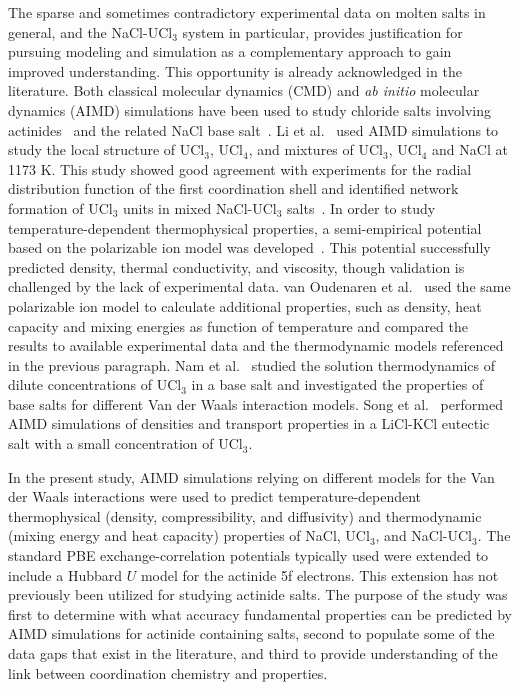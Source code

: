 \documentclass[preprint,3p,10pt,onecolumn,number,sort&compress]{elsarticle}
\begin{document}
The sparse and sometimes contradictory experimental data on molten salts in general, and the NaCl-UCl$_3$ system in particular, provides justification for pursuing modeling and simulation as a complementary approach to gain improved understanding. This opportunity is already acknowledged in the literature. Both classical molecular dynamics (CMD) and \textit{ab initio} molecular dynamics (AIMD) simulations have been used to study chloride salts involving actinides~\cite{Li,Li2020,Nam2015,SONG,VANOUDENAREN2021117470} and the related NaCl base salt~\cite{NGUYEN2021115262,LI2021100359,Tovey}. Li et al.~\cite{Li} used AIMD simulations to study the local structure of UCl$_3$, UCl$_4$, and mixtures of UCl$_3$, UCl$_4$ and NaCl at 1173 K. This study showed good agreement with experiments for the radial distribution function of the first coordination shell and identified network formation of UCl$_3$ units in mixed NaCl-UCl$_3$ salts~\cite{Li}. %
In order to study temperature-dependent thermophysical properties, a semi-empirical potential based on the polarizable ion model was developed~\cite{Li2020}. This potential successfully predicted density, thermal conductivity, and viscosity, though validation is challenged by the lack of experimental data. van Oudenaren et al.~\cite{VANOUDENAREN2021117470} used the same polarizable ion model to calculate additional properties, such as density, heat capacity and mixing energies as function of temperature and compared the results to available experimental data and the thermodynamic models referenced in the previous paragraph. 
Nam et al.~\cite{Nam2015} studied the solution thermodynamics of dilute concentrations of UCl$_3$ in a base salt and investigated the properties of base salts for different Van der Waals interaction models. Song et al.~\cite{SONG} performed AIMD simulations of densities and transport properties in a LiCl-KCl eutectic salt with a small concentration of UCl$_3$. 

In the present study, AIMD simulations relying on different models for the Van der Waals interactions were used to predict temperature-dependent thermophysical (density, compressibility, and diffusivity) and thermodynamic (mixing energy and heat capacity) properties of NaCl, UCl$_3$, and NaCl-UCl$_3$. The standard PBE exchange-correlation potentials typically used were extended to include a Hubbard $U$ model for the actinide 5f electrons. This extension has not previously been utilized for studying actinide salts. The purpose of the study was first to determine with what accuracy fundamental properties can be predicted by AIMD simulations for actinide containing salts, second to populate some of the data gaps that exist in the literature, and third to provide understanding of the link between coordination chemistry and properties. 
\end{document}
